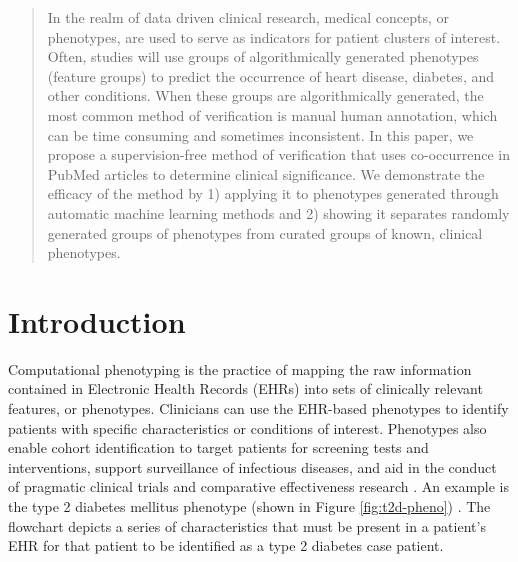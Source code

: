 \documentclass{sig-alternate}
\begin{document}
\maketitle
\begin{abstract}
In the realm of data driven clinical research, medical concepts, or phenotypes, are used to serve as indicators for patient clusters of interest. Often, studies will use groups of algorithmically generated phenotypes (feature groups) to predict the occurrence of heart disease, diabetes, and other conditions. 
When these groups are algorithmically generated, the most common method of verification is manual human annotation, which can be time consuming and sometimes inconsistent.
In this paper, we propose a supervision-free method of verification that uses co-occurrence in PubMed articles to determine clinical significance.
We demonstrate the efficacy of the method by 1) applying it to phenotypes generated through automatic machine learning methods and 2) showing it separates randomly generated groups of phenotypes from curated groups of known, clinical phenotypes. 
\end{abstract}


\section{Introduction}

Computational phenotyping is the practice of mapping the raw information contained in Electronic Health Records (EHRs) into sets of clinically relevant features, or phenotypes.
Clinicians can use the EHR-based phenotypes to identify patients with specific characteristics or conditions of interest.
Phenotypes also enable cohort identification to target patients for screening tests and interventions, support surveillance of infectious diseases, and aid in the conduct of pragmatic clinical trials and comparative effectiveness research \cite{Collaboratory:MR-x2zyZ}.
An example is the type 2 diabetes mellitus phenotype (shown in Figure \ref{fig:t2d-pheno}) \cite{kho_use_2012}.
The flowchart depicts a series of characteristics that must be present in a patient's EHR for that patient to be identified as a type 2 diabetes case patient.
\end{document}
